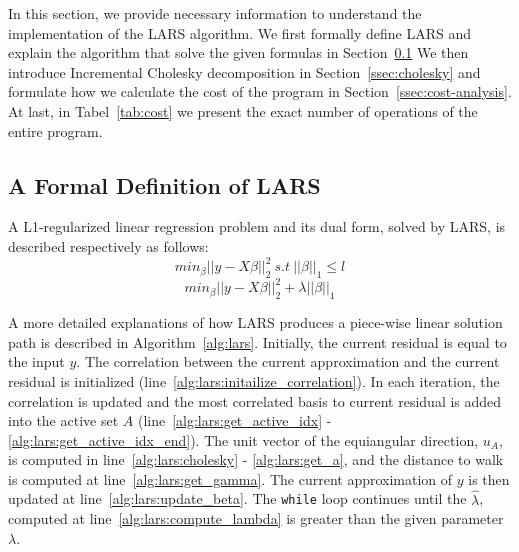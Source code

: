 
In this section, we provide necessary information to understand the implementation of the LARS algorithm.
We first formally define LARS and explain the algorithm that solve the given formulas in Section~\ref{ssec:lars}
We then introduce Incremental Cholesky decomposition in Section~\ref{ssec:cholesky} and formulate how we calculate the cost of the program in Section~\ref{ssec:cost-analysis}.
At last, in Tabel~\ref{tab:cost} we present the exact number of operations of the entire program.

\subsection{A Formal Definition of LARS}
\label{ssec:lars}
A L1-regularized linear regression problem and its dual form, solved by LARS, is described respectively as follows:
$$
min_\beta{||y-X\beta||^2_2} \ s.t\ ||\beta||_1 \leq l
$$
$$
min_\beta{||y-X\beta||^2_2} + \lambda||\beta||_1
$$

A more detailed explanations of how LARS produces a piece-wise linear solution path is described in Algorithm~\ref{alg:lars}.
Initially, the current residual is equal to the input $y$. 
The correlation between the current approximation and the current residual is initialized (line~\ref{alg:lars:initailize_correlation}).
In each iteration, the correlation is updated and the most correlated basis to current residual is added into the active set $A$ (line~\ref{alg:lars:get_active_idx} - \ref{alg:lars:get_active_idx_end}).
The unit vector of the equiangular direction, $u_A$, is computed in line~\ref{alg:lars:cholesky} - \ref{alg:lars:get_a}, and the distance to walk is computed at line~\ref{alg:lars:get_gamma}.
The current approximation of $y$ is then updated at line~\ref{alg:lars:update_beta}.
The \texttt{while} loop continues until the $\hat{\lambda}$, computed at line~\ref{alg:lars:compute_lambda} is greater than the given parameter $\lambda$.


